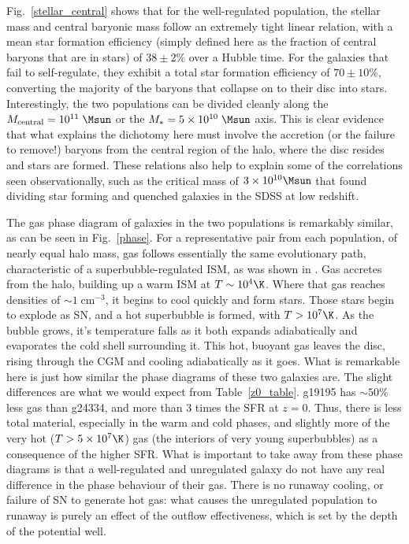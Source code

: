 Fig.~\ref{stellar_central} shows that for the well-regulated population, the
stellar mass and central baryonic mass follow an extremely tight linear
relation, with a mean star formation efficiency (simply defined here as the
fraction of central baryons that are in stars) of $38\pm2\%$ over a Hubble time.
For the galaxies that fail to self-regulate, they exhibit a total star formation
efficiency of $70\pm10\%$, converting the majority of the baryons that collapse
on to their disc into stars.  Interestingly, the two populations can be divided
cleanly along the $M_{\rm central}=10^{11}\;\Msun$ or the
$M_*=5\times10^{10}\;\Msun$ axis.  This is clear evidence that what explains
the dichotomy here must involve the accretion (or the failure to remove!)
baryons from the central region of the halo, where the disc resides and stars
are formed.  These relations also help to explain some of the correlations seen
observationally, such as the critical mass of $3\times10^{10}\Msun$ that 
\citet{Kauffmann2003a} found dividing star forming and quenched galaxies in the
SDSS at low redshift.

The gas phase diagram of galaxies in the two populations is remarkably similar,
as can be seen in Fig.~\ref{phase}.  For a representative pair from each
population, of nearly equal halo mass, gas follows essentially the same
evolutionary path, characteristic of a superbubble-regulated ISM, as was shown in
\citet{Keller2015}.  Gas accretes from the halo,
building up a warm ISM at $T\sim10^4\K$.  Where that gas reaches densities of
$\sim 1\;$cm$^{-3}$, it begins to cool quickly and form stars.  Those stars begin to
explode as SN, and a hot superbubble is formed, with $T>10^7\K$.  As the bubble
grows, it's temperature falls as it both expands adiabatically and evaporates
the cold shell surrounding it.  This hot, buoyant gas leaves the disc, rising
through the CGM and cooling adiabatically as it goes.  What is remarkable here
is just how similar the phase diagrams of these two galaxies are.  The slight
differences are what we would expect from Table~\ref{z0_table}.  g19195 has
$\sim50\%$ less gas than g24334, and more than 3 times the SFR at $z=0$.  Thus,
there is less total material, especially in the warm and cold phases, and
slightly more of the very hot ($T>5\times10^7\K$) gas (the interiors of very young
superbubbles) as a consequence of the higher SFR.  What is important to take
away from these phase diagrams is that a well-regulated and unregulated galaxy
do not have any real difference in the phase behaviour of their gas.  There is
no runaway cooling, or failure of SN to generate hot gas:  what causes the
unregulated population to runaway is purely an effect of the outflow
effectiveness, which is set by the depth of the potential well.

